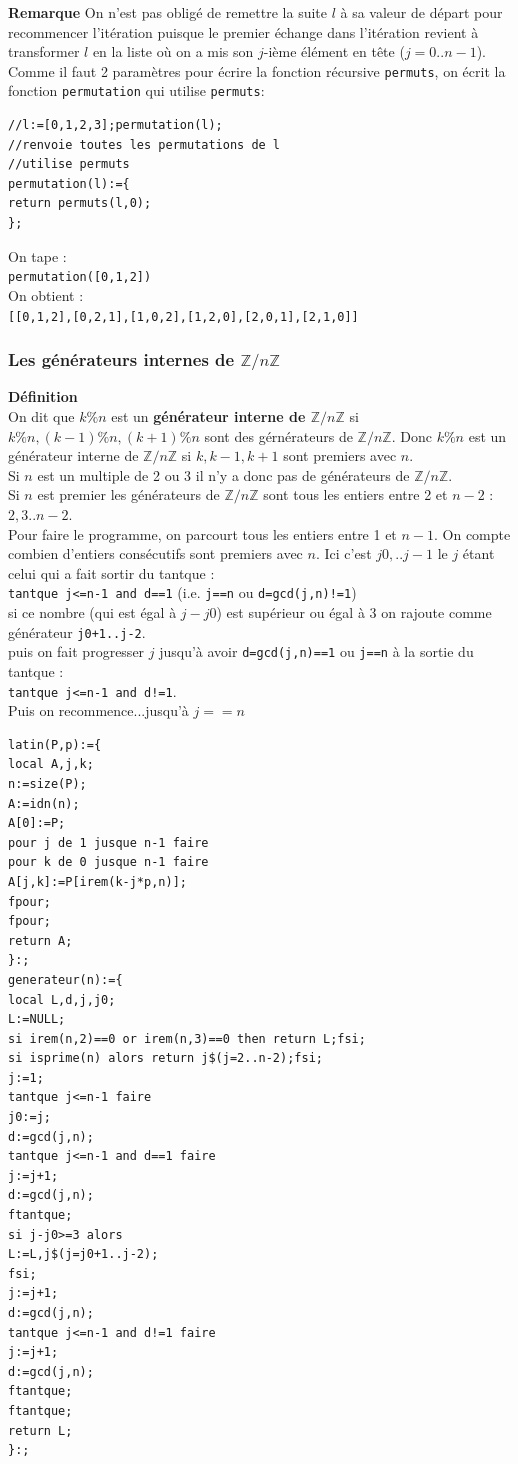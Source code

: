 \documentclass[a4paper,11pt]{book}
\newcommand{\Z}{{\mathbb{Z}}}
\begin{document}
{\bf Remarque} On n'est pas oblig\'e de remettre la suite $l$ \`a sa valeur de 
d\'epart pour recommencer l'it\'eration puisque le premier \'echange dans
 l'it\'eration revient \`a transformer $l$ en la liste o\`u on a mis son 
$j$-i\`eme \'el\'ement en t\^ete ($j=0..n-1$).\\
Comme il faut 2 param\`etres pour \'ecrire la fonction r\'ecursive 
{\tt permuts}, on \'ecrit la fonction {\tt permutation} qui utilise 
{\tt permuts}:
\begin{verbatim}
//l:=[0,1,2,3];permutation(l); 
//renvoie toutes les permutations de l
//utilise permuts
permutation(l):={
return permuts(l,0);
};
\end{verbatim} 
On tape :\\
{\tt permutation([0,1,2])}\\
On obtient :\\
{\tt [[0,1,2],[0,2,1],[1,0,2],[1,2,0],[2,0,1],[2,1,0]]}
\subsubsection{Les g\'en\'erateurs internes de $\Z/n\Z$}
{\bf D\'efinition} \\
On dit que $k\%n$ est un {\bf g\'en\'erateur interne de $\Z/n\Z$} si 
$k\%n,(k-1)\%n,(k+1)\%n$ sont des g\'ern\'erateurs de $\Z/n\Z$.
Donc $k\%n$ est un g\'en\'erateur interne de $\Z/n\Z$ si $k,k-1,k+1$ sont
premiers avec $n$.\\
Si $n$ est un multiple de 2 ou 3 il n'y a donc pas de g\'en\'erateurs de 
$\Z/n\Z$.\\
Si $n$ est premier les g\'en\'erateurs de $\Z/n\Z$ sont tous les entiers entre 
2 et $n-2$ :$2,3..n-2$.\\
Pour faire le programme, on parcourt tous les entiers entre 1 et $n-1$.
On compte combien d'entiers cons\'ecutifs sont premiers avec $n$. Ici c'est 
$j0,..j-1$ le $j$ \'etant celui qui a fait sortir du tantque :\\
 {\tt tantque j<=n-1 and d==1} (i.e. {\tt j==n} ou {\tt d=gcd(j,n)!=1})\\
si ce nombre (qui est \'egal \`a $j-j0$) est sup\'erieur ou \'egal \`a 3 on 
rajoute comme g\'en\'erateur {\tt j0+1..j-2}.\\
puis on fait progresser $j$ jusqu'\`a avoir {\tt d=gcd(j,n)==1} ou {\tt j==n}
\`a la sortie du tantque :\\
{\tt tantque j<=n-1 and d!=1}.\\
Puis on recommence...jusqu'\`a $j==n$
\begin{verbatim}
latin(P,p):={
local A,j,k;
n:=size(P);
A:=idn(n);
A[0]:=P;
pour j de 1 jusque n-1 faire
pour k de 0 jusque n-1 faire
A[j,k]:=P[irem(k-j*p,n)];
fpour;
fpour;
return A;
}:;
generateur(n):={
local L,d,j,j0;
L:=NULL;
si irem(n,2)==0 or irem(n,3)==0 then return L;fsi;
si isprime(n) alors return j$(j=2..n-2);fsi;
j:=1;
tantque j<=n-1 faire
j0:=j;
d:=gcd(j,n);
tantque j<=n-1 and d==1 faire
j:=j+1;
d:=gcd(j,n);
ftantque;
si j-j0>=3 alors 
L:=L,j$(j=j0+1..j-2);
fsi;
j:=j+1;
d:=gcd(j,n);
tantque j<=n-1 and d!=1 faire
j:=j+1;
d:=gcd(j,n);
ftantque;
ftantque;
return L;
}:;
\end{verbatim}
\end{document}

